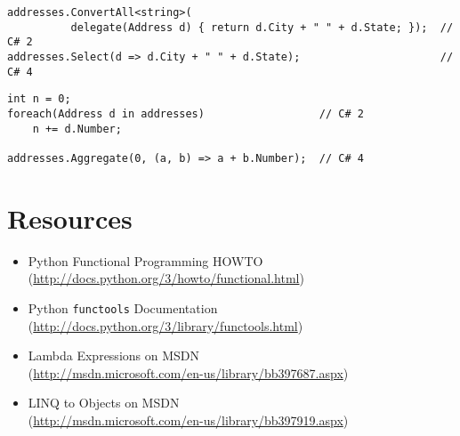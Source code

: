 \documentclass{article}\usepackage{beamerarticle}
\begin{document}
\begin{lstlisting}[style=csharp,caption={Map in C\#},label={lst:csharp_map}]
addresses.ConvertAll<string>(
          delegate(Address d) { return d.City + " " + d.State; });  // C# 2
addresses.Select(d => d.City + " " + d.State);                      // C# 4
\end{lstlisting}

\begin{lstlisting}[style=csharp,caption={Reduce in C\#},label={lst:csharp_reduce}]
int n = 0;
foreach(Address d in addresses)                  // C# 2
    n += d.Number;

addresses.Aggregate(0, (a, b) => a + b.Number);  // C# 4
\end{lstlisting}

\section*{Resources}
\begin{frame}
\begin{itemize}
	\item Python Functional Programming HOWTO\\ (\url{http://docs.python.org/3/howto/functional.html})
	\item Python {\tt functools} Documentation\\ (\url{http://docs.python.org/3/library/functools.html})
	\item Lambda Expressions on MSDN\\ (\url{http://msdn.microsoft.com/en-us/library/bb397687.aspx})
	\item LINQ to Objects on MSDN\\ (\url{http://msdn.microsoft.com/en-us/library/bb397919.aspx})
\end{itemize}
\end{frame}
\end{document}
